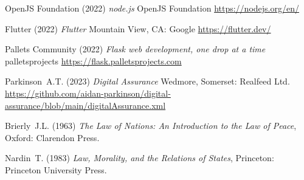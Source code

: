 \documentclass[11pt, oneside]{book}   	%
\begin{document}
\begin{thebibliography}{99}
 OpenJS Foundation (2022)
\emph{node.js}
OpenJS Foundation
\url{https://nodejs.org/en/}

 Flutter (2022)
\emph{Flutter}
Mountain View, CA: Google 
\url{https://flutter.dev/}

 Pallets Community (2022)
\emph{Flask web development, one drop at a time}
palletsprojects
\url{https://flask.palletsprojects.com}

 Parkinson~A.T. (2023)
\emph{Digital Assurance}
Wedmore, Somerset: Realfeed Ltd.
\url{https://github.com/aidan-parkinson/digital-assurance/blob/main/digitalAssurance.xml}

 Brierly~J.L. (1963)
\emph{The Law of Nations: An Introduction to the Law of Peace},
Oxford: Clarendon Press.

 Nardin~T. (1983)
\emph{Law, Morality, and the Relations of States},
Princeton: Princeton University Press.

\end{thebibliography}

\newpage
\thispagestyle{empty}
\mbox{}
\newpage
\end{document}
